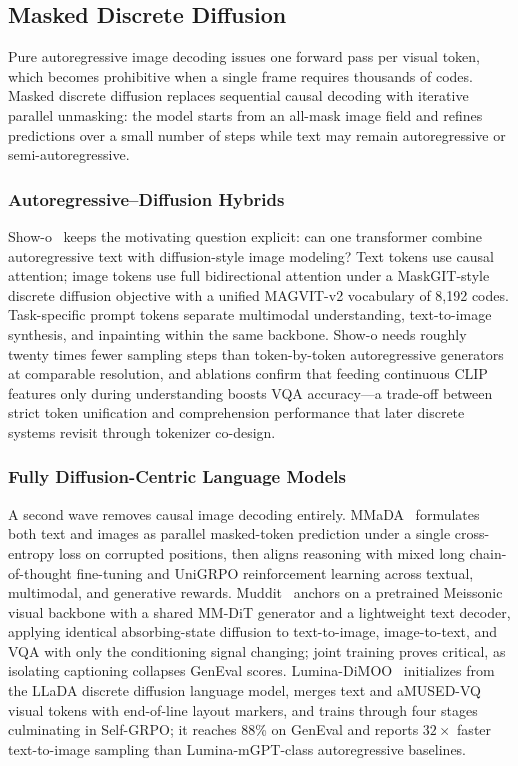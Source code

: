 \subsection{Masked Discrete Diffusion}
\label{subsec:masked-diffusion}

Pure autoregressive image decoding issues one forward pass per visual token, which becomes prohibitive when a single frame requires thousands of codes. Masked discrete diffusion replaces sequential causal decoding with iterative parallel unmasking: the model starts from an all-mask image field and refines predictions over a small number of steps while text may remain autoregressive or semi-autoregressive.

\subsubsection{Autoregressive--Diffusion Hybrids}
\label{subsubsec:showo-line}

Show-o~\cite{xie2025show} keeps the motivating question explicit: can one transformer combine autoregressive text with diffusion-style image modeling? Text tokens use causal attention; image tokens use full bidirectional attention under a MaskGIT-style discrete diffusion objective with a unified MAGVIT-v2 vocabulary of 8,192 codes. Task-specific prompt tokens separate multimodal understanding, text-to-image synthesis, and inpainting within the same backbone. Show-o needs roughly twenty times fewer sampling steps than token-by-token autoregressive generators at comparable resolution, and ablations confirm that feeding continuous CLIP features only during understanding boosts VQA accuracy---a trade-off between strict token unification and comprehension performance that later discrete systems revisit through tokenizer co-design.

\subsubsection{Fully Diffusion-Centric Language Models}
\label{subsubsec:full-diffusion}

A second wave removes causal image decoding entirely. MMaDA~\cite{yang2026mmada} formulates both text and images as parallel masked-token prediction under a single cross-entropy loss on corrupted positions, then aligns reasoning with mixed long chain-of-thought fine-tuning and UniGRPO reinforcement learning across textual, multimodal, and generative rewards. Muddit~\cite{shi2025muddit} anchors on a pretrained Meissonic visual backbone with a shared MM-DiT generator and a lightweight text decoder, applying identical absorbing-state diffusion to text-to-image, image-to-text, and VQA with only the conditioning signal changing; joint training proves critical, as isolating captioning collapses GenEval scores. Lumina-DiMOO~\cite{xin2025lumina} initializes from the LLaDA discrete diffusion language model, merges text and aMUSED-VQ visual tokens with end-of-line layout markers, and trains through four stages culminating in Self-GRPO; it reaches 88\% on GenEval and reports $32\times$ faster text-to-image sampling than Lumina-mGPT-class autoregressive baselines.

